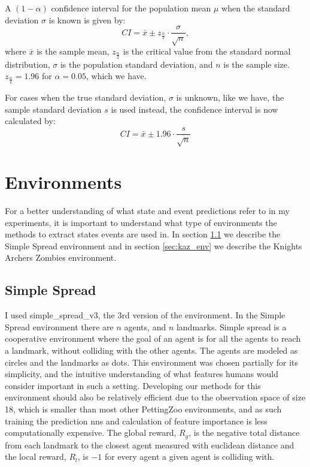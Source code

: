 \documentclass[UKenglish]{uiomasterthesis}
\begin{document}
A $(1-\alpha)$ confidence interval for the population mean \( \mu \) when the standard deviation \( \sigma \) is known is given by:
\[
CI = \bar{x} \pm z_{\frac{\alpha}{2}} \cdot \frac{\sigma}{\sqrt{n}},
\]
where $\bar{x}$ is the sample mean, $z_{\frac{\alpha}{2}}$ is the critical value from the standard normal distribution, $\sigma$ is the population standard deviation, and $n$ is the sample size. $z_{\frac{\alpha}{2}} = 1.96$ for $\alpha = 0.05$, which we have.

For cases when the true standard deviation, $\sigma$ is unknown, like we have, the sample standard deviation $s$ is used instead, the confidence interval is now calculated by:
\[
CI = \bar{x} \pm 1.96 \cdot \frac{s}{\sqrt{n}}
\]


\section{Environments}
\label{sec:env_meth}
For a better understanding of what state and event predictions refer to in my experiments, it is important to understand what type of environments the methods to extract states events are used in. In section \ref{sec:simpl_env} we describe the Simple Spread environment and in section \ref{sec:kaz_env} we describe the Knights Archers Zombies environment.

\subsection{Simple Spread}
\label{sec:simpl_env}
I used simple\_spread\_v3, the 3rd version of the environment. In the Simple Spread environment there are $n$ agents, and $n$ landmarks. Simple spread is a cooperative environment where the goal of an agent is for all the agents to reach a landmark, without colliding with the other agents. The agents are modeled as circles and the landmarks as dots. This environment was chosen partially for its simplicity, and the intuitive understanding of what features humans would consider important in such a setting. Developing our methods for this environment should also be relatively efficient due to the observation space of size 18, which is smaller than most other PettingZoo environments, and as such training the prediction \acp{nn} and calculation of feature importance is less computationally expensive. The global reward, $R_g$, is the negative total distance from each landmark to the closest agent measured with euclidean distance and the local reward, $R_l$, is $-1$ for every agent a given agent is colliding with.
\end{document}
